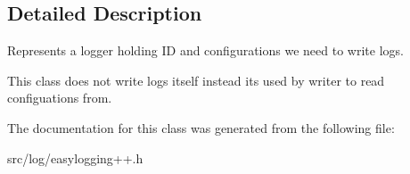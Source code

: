 \subsection{Detailed Description}
Represents a logger holding ID and configurations we need to write logs. 

This class does not write logs itself instead its used by writer to read configuations from. 

The documentation for this class was generated from the following file\+:\begin{DoxyCompactItemize}
\item 
src/log/easylogging++.\+h\end{DoxyCompactItemize}

